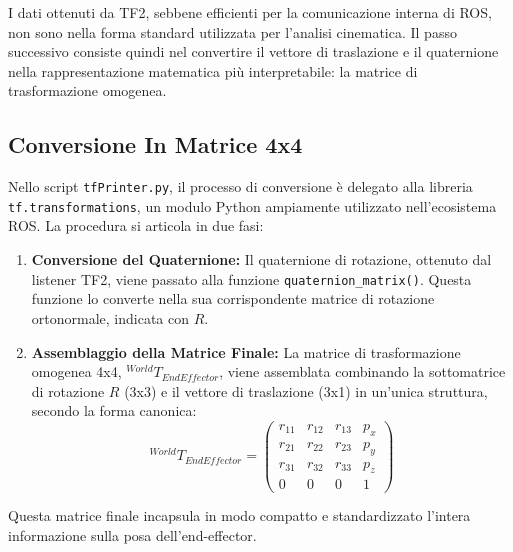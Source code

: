 \documentclass[11pt, a4paper]{report}
\begin{document}
I dati ottenuti da TF2, sebbene efficienti per la comunicazione interna di ROS, non sono nella forma standard utilizzata per l'analisi cinematica. Il passo successivo consiste quindi nel convertire il vettore di traslazione e il quaternione nella rappresentazione matematica più interpretabile: la matrice di trasformazione omogenea.

\subsection{Conversione In Matrice 4x4}
\label{subsec:conversione_matrice}
Nello script \texttt{tfPrinter.py}, il processo di conversione è delegato alla libreria \texttt{tf.transformations}, un modulo Python ampiamente utilizzato nell'ecosistema ROS. La procedura si articola in due fasi:
\begin{enumerate}
    \item \textbf{Conversione del Quaternione:} Il quaternione di rotazione, ottenuto dal listener TF2, viene passato alla funzione \texttt{quaternion\_matrix()}. Questa funzione lo converte nella sua corrispondente matrice di rotazione ortonormale, indicata con \(R\).

    \item \textbf{Assemblaggio della Matrice Finale:} La matrice di trasformazione omogenea 4x4, \(^{World}T_{EndEffector}\), viene assemblata combinando la sottomatrice di rotazione \(R\) (3x3) e il vettore di traslazione (3x1) in un'unica struttura, secondo la forma canonica:
    \[
        ^{World}T_{EndEffector} =
        \begin{pmatrix}
        r_{11} & r_{12} & r_{13} & p_x \\
        r_{21} & r_{22} & r_{23} & p_y \\
        r_{31} & r_{32} & r_{33} & p_z \\
        0 & 0 & 0 & 1
        \end{pmatrix}
    \]
\end{enumerate}
Questa matrice finale incapsula in modo compatto e standardizzato l'intera informazione sulla posa dell'end-effector.
\end{document}
